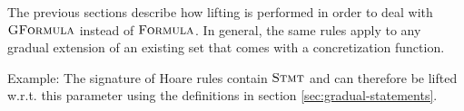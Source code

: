 The previous sections describe how lifting is performed in order to deal with $\textsc{GFormula}$ instead of $\textsc{Formula}$.
In general, the same rules apply to any gradual extension of an existing set that comes with a concretization function.

Example: 
The signature of Hoare rules contain $\textsc{Stmt}$ and can therefore be lifted w.r.t. this parameter using the definitions in section \ref{sec:gradual-statements}.